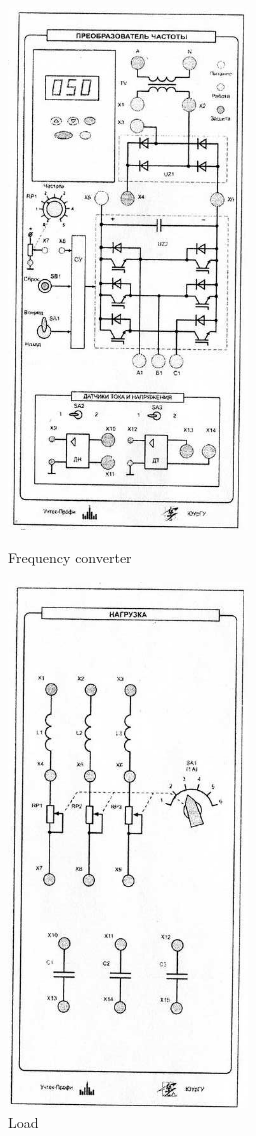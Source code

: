 \documentclass[a4paper,14pt]{article}
\begin{document}
\begin{figure}[!ht]
\centering
\begin{minipage}[c]{0.4\textwidth}
\centering
    \includegraphics[width=2.5in]{lab7_fig1}
    \caption{Frequency converter}
    \label{fig:fc}
\end{minipage}
\noindent
\begin{minipage}[c]{0.4\textwidth}
\centering
    \includegraphics[width=2.5in]{lab7_fig2}
    \caption{Load}
    \label{fig:load}
\end{minipage}

\end{figure}
\end{document}
